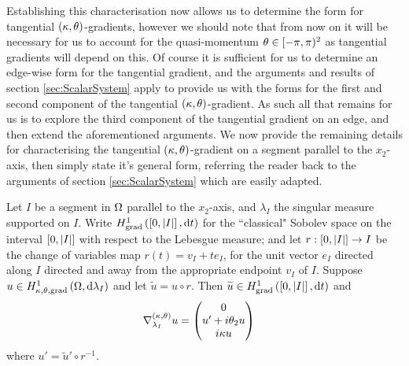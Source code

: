 Establishing this characterisation now allows us to determine the form for tangential $\left( \kappa, \theta \right)$-gradients, however we should note that from now on it will be necessary for us to account for the quasi-momentum $\theta\in[-\pi,\pi)^2$ as tangential gradients will depend on this.
Of course it is sufficient for us to determine an edge-wise form for the tangential gradient, and the arguments and results of section \ref{sec:ScalarSystem} apply to provide us with the forms for the first and second component of the tangential $\left( \kappa, \theta \right)$-gradient.
As such all that remains for us is to explore the third component of the tangential gradient on an edge, and then extend the aforementioned arguments.
We now provide the remaining details for characterising the tangential $\left( \kappa, \theta \right)$-gradient on a segment parallel to the $x_2$-axis, then simply state it's general form, referring the reader back to the arguments of section \ref{sec:ScalarSystem} which are easily adapted.
\begin{prop} \label{prop:ktTangentialGradientSegment}
	Let $I$ be a segment in $\Omega$ parallel to the $x_2$-axis, and $\lambda_I$ the singular measure supported on $I$.
	Write $H^1_\mathrm{grad}\left( \left[ 0,\left\lvert I \right\rvert \right], \mathrm{d}t \right)$ for the ``classical" Sobolev space on the interval $\left[ 0,\left\lvert I \right\rvert \right]$ with respect to the Lebesgue measure; and let $r:\left[ 0,\left\lvert I \right\rvert \right]\rightarrow I$ be the change of variables map $r(t) = v_I + te_I$, for the unit vector $e_I$ directed along $I$ directed and away from the appropriate endpoint $v_I$ of $I$.
	Suppose $u\in H^1_{\kappa,\theta,\mathrm{grad}}\left( \Omega, \mathrm{d}\lambda_I \right)$ and let $\widetilde{u} = u\circ r$. 
	Then $\widetilde{u}\in H^1_\mathrm{grad}\left( \left[ 0,\left\lvert I \right\rvert \right], \mathrm{d}t \right)$ and 
	\begin{align*}
		\nabla^{\left( \kappa, \theta \right)}_{\lambda_I}u &= \begin{pmatrix} 0 \\ u' + i\theta_2 u \\ i\kappa u\end{pmatrix}
	\end{align*}
	where $u' = \widetilde{u}'\circ r^{-1}$.
\end{prop}
